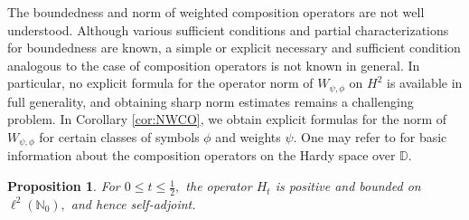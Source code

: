 \documentclass[12pt, reqno]{amsart}
\numberwithin{equation}{section}
\newtheorem{proposition}[theorem]{Proposition}
\begin{document}
 The boundedness and norm of weighted composition operators are not well understood. Although various sufficient conditions and partial characterizations for boundedness are known, a simple or explicit necessary and sufficient condition  analogous to the case of composition operators is not known in general. In particular, no explicit formula for the operator norm of $W_{\psi,\phi}$ on $H^2$ is available in full generality, and obtaining sharp norm estimates remains a challenging problem. In  Corollary \ref{cor:NWCO},  we obtain explicit formulas for the norm of $W_{\psi,\phi}$ for certain classes of symbols $\phi$ and weights $\psi$.
 One may refer to \cite{shap,cow} for basic information about the composition operators on the Hardy space over $\mathbb{D}$.

\begin{proposition}\label{prop: hbd}
    For $0\leq t\leq \frac{1}{2},$ the operator $H_t$ is positive and bounded  on $\ell^2(\mathbb{N}_0),$ and hence self-adjoint.
\end{proposition}
\end{document}
